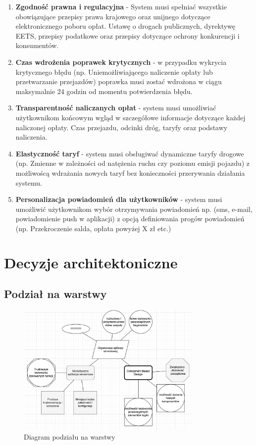 \documentclass[12pt]{article}
\begin{document}
\begin{enumerate}
    \item \textbf{Zgodność prawna i regulacyjna} - System musi spełniać wszystkie obowiązujące przepisy prawa krajowego oraz unijnego dotyczące elektronicznego poboru opłat. Ustawę o drogach publicznych, dyrektywę EETS, przepisy podatkowe oraz przepisy dotyczące ochrony konkurencji i konsumentów.

    \item \textbf{Czas wdrożenia poprawek krytycznych} - w przypadku wykrycia krytycznego błędu (np. Uniemożliwiającego naliczenie opłaty lub przetwarzanie przejazdów) poprawka musi zostać wdrożona w ciągu maksymalnie 24 godzin od momentu potwierdzenia błędu.

    \item \textbf{Transparentność naliczanych opłat} - system musi umożliwiać użytkownikom końcowym wgląd w szczegółowe informacje dotyczące każdej naliczonej opłaty. Czas przejazdu, odcinki dróg, taryfy oraz podstawy naliczenia.

    \item \textbf{Elastyczność taryf} - system musi obsługiwać dynamiczne taryfy drogowe (np. Zmienne w zależności od natężenia ruchu czy poziomu emisji pojazdu) z możliwoścą wdrażania nowych taryf bez konieczności przerywania działania systemu.

    \item \textbf{Personalizacja powiadomień dla użytkowników} - system musi umożliwić użytkownikom wybór otrzymywania powiadomień np. (sms, e-mail, powiadomienie push w aplikacji) z opcją definiowania progów powiadomień (np. Przekroczenie salda, opłata powyżej X zł etc.)
\end{enumerate}

\section{Decyzje architektoniczne}

\subsection{Podział na warstwy}
\begin{figure}[h]
\centering
\includegraphics[width=0.8\textwidth]{organizacja_aplikacji_serwerowej.png}
\caption{Diagram podziału na warstwy}
\label{fig:layers}
\end{figure}
\end{document}
